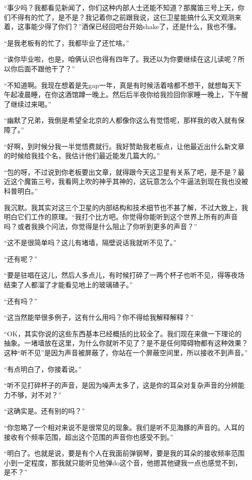 \documentclass[a4paper, 10pt]{article}
\begin{document}
“事少吗？我都看见新闻了，你们这种内部人士还能不知道？那魔笛三号上天，你们不得有的忙了，是不是？我记着你之前跟我说，这仨卫星能搞什么天文观测来着，这事能少得了你们？”酒保已经回吧台开始shake了，还是什么，我也不懂。

“是我老板有的忙了，我都毕业了还忙啥。”

“诶你毕业啦，也是，咱俩认识也得有四年了。我还以为你要继续在这儿读呢？所以你后面不跟他干了？”

“不知道啊。我现在想着是先gap一年，真是有时候活着啥都不想干，就想每天下午起凌晨睡，在你这酒馆蹲一晚上。然后后半夜你给我捡回你家睡一晚上，下午醒了继续过来喝。”

“幽默了兄弟，我倒是希望全北京的人都像你这么有觉悟呢，那样我的收入就有保障了。”

“好啊，到时候分我一半觉悟费就行。我好赞助我老板点，让他最近出什么新文章的时候给我挂个名，我估计他们最近能发几篇大的。”

“包的呀，不过说到你老板要出文章，就得跟今天这卫星有关系了吧，是不是？最近这个魔笛三号，我看网上吹的神乎其神的，这玩意怎么个牛逼法到现在我也没被科普明白。”

我沉默。我其实对这三个卫星的内部结构和技术细节也不甚了解，不过大致上，我明白它们工作的原理。“我打个比方吧。你觉得你能听到这个世界上所有的声音吗？或者我换个问法，你觉得是什么阻止了你听到更多的声音？”

“这不是很简单吗？这儿有堵墙，隔壁说话我就听不见了。”


“还有呢？”

“要是驻唱在这儿，然后人多点儿，有时候打碎了一两个杯子也听不见，得等夜场结束了人都溜了才能看见地上的玻璃碴子。”

“还有吗？”

“这当然能举很多例子，这有什么用吗？你不得给我解释解释？”

“OK，其实你说的这些东西基本已经概括的比较全了。我们现在来做一下理论的抽象。一堵墙放在这里，为什么你就听不见了？是不是任何障碍物都有这种效果？这种“听不见”是因为声音被屏蔽了，你站在一个屏蔽空间里，所以接收不到声音。”

“有点明白了，你接着说。”

“听不见打碎杯子的声音，是因为噪声太多了，这是你的耳朵对复杂声音的分辨能力不够，对不对？”

“这确实是。还有别的吗？”

“你忽略了一个相对来说不是很常见的现象。我们是听不见海豚的声音的。人耳的接收有个频率范围，超出这个范围的声音你也感受不到。”

“明白了。也就是说，要是有个人在我面前弹钢琴，要是我的耳朵的接收频率范围小到一定程度，那我就只能听见他弹do这个音，他摁其他键我一点也感觉不到，是不？”
\end{document}
